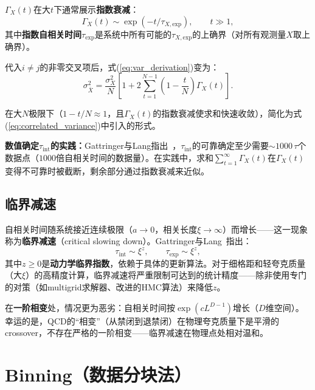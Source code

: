 \documentclass[12pt,a4paper]{ctexart}
\theoremstyle{definition}
\begin{document}
$\Gamma_X(t)$在大$t$下通常展示\textbf{指数衰减}：
\begin{equation}
\Gamma_X(t) \sim \exp(-t / \tau_{X,\text{exp}}), \qquad t \gg 1,
\label{eq:exp_decay}
\end{equation}
其中{\bf 指数自相关时间}$\tau_{\text{exp}}$是系统中所有可能的$\tau_{X,\text{exp}}$的上确界（对所有观测量$X$取上确界）。

代入$i\neq j$的非零交叉项后，式(\ref{eq:var_derivation})变为：
\begin{equation}
\sigma^2_{\bar X} = \frac{\sigma_X^2}{N} \left[ 1 + 2\sum_{t=1}^{N-1} \left(1 - \frac{t}{N}\right) \Gamma_X(t) \right].
\label{eq:full_correlated_variance}
\end{equation}

在大$N$极限下（$1 - t/N \approx 1$，且$\Gamma_X(t)$的指数衰减使求和快速收敛），简化为式(\ref{eq:correlated_variance})中引入的形式。

\textbf{数值确定$\tau_{\text{int}}$的实践：}Gattringer与Lang指出~\cite{GattringerLang2010}，$\tau_{\text{int}}$的可靠确定至少需要$\sim 1000\,\tau$个数据点（$1000$倍自相关时间的数据量）。在实践中，求和$\sum_{t=1}^{\infty}\Gamma_X(t)$在$\Gamma_X(t)$变得不可靠时被截断，剩余部分通过指数衰减来近似。

\subsection{临界减速}

自相关时间随系统接近连续极限（$a \to 0$，相关长度$\xi \to \infty$）而增长——这一现象称为\textbf{临界减速}（critical slowing down）。Gattringer与Lang~\cite{GattringerLang2010}指出：
\begin{equation}
\tau_{\text{int}} \sim \xi^z, \qquad \tau_{\text{exp}} \sim \xi^z,
\label{eq:critical_slowing}
\end{equation}
其中$z \ge 0$是\textbf{动力学临界指数}，依赖于具体的更新算法。对于细格距和轻夸克质量（大$\xi$）的高精度计算，临界减速将严重限制可达到的统计精度——除非使用专门的对策（如multigrid求解器、改进的HMC算法）来降低$z$。

在\textbf{一阶相变}处，情况更为恶劣：自相关时间按$\exp(c L^{D-1})$增长（$D$维空间）。幸运的是，QCD的``相变''（从禁闭到退禁闭）在物理夸克质量下是平滑的crossover，不存在严格的一阶相变——临界减速在物理点处相对温和。

\section{Binning（数据分块法）}
\end{document}
